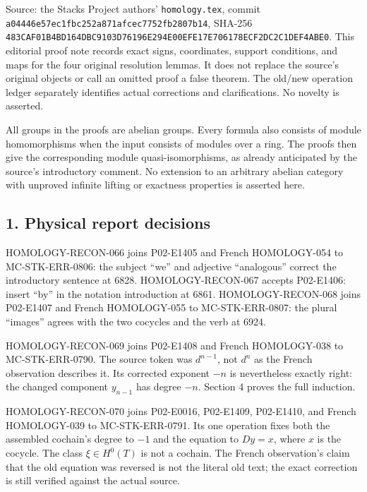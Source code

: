 \documentclass[11pt]{article}
\begin{document}
Source: the Stacks Project authors' \texttt{homology.tex}, commit \texttt{a04446e5\allowbreak{}7ec1fbc2\allowbreak{}52a871af\allowbreak{}cec7752f\allowbreak{}b2807b14}, SHA-256 \texttt{483CAF01\allowbreak{}B4BD164D\allowbreak{}BC9103D7\allowbreak{}6196E294\allowbreak{}E00EFE17\allowbreak{}E706178E\allowbreak{}CF2DC2C1\allowbreak{}DEF4ABE0}. This editorial proof note records exact signs, coordinates, support conditions, and maps for the four original resolution lemmas. It does not replace the source's original objects or call an omitted proof a false theorem. The old/new operation ledger separately identifies actual corrections and clarifications. No novelty is asserted.

All groups in the proofs are abelian groups. Every formula also consists of module homomorphisms when the input consists of modules over a ring. The proofs then give the corresponding module quasi-isomorphisms, as already anticipated by the source's introductory comment. No extension to an arbitrary abelian category with unproved infinite lifting or exactness properties is asserted here.

\subsection{1. Physical report decisions}\label{note-08-physical-report-decisions}

HOMOLOGY-RECON-066 joins P02-E1405 and French HOMOLOGY-054 to MC-STK-ERR-0806: the subject ``we'' and adjective ``analogous'' correct the introductory sentence at 6828. HOMOLOGY-RECON-067 accepts P02-E1406: insert ``by'' in the notation introduction at 6861. HOMOLOGY-RECON-068 joins P02-E1407 and French HOMOLOGY-055 to MC-STK-ERR-0807: the plural ``images'' agrees with the two cocycles and the verb at 6924.

HOMOLOGY-RECON-069 joins P02-E1408 and French HOMOLOGY-038 to MC-STK-ERR-0790. The source token was \(d^{n-1}\), not \(d^n\) as the French observation describes it. Its corrected exponent \(-n\) is nevertheless exactly right: the changed component \(y_{n-1}\) has degree \(-n\). Section 4 proves the full induction.

HOMOLOGY-RECON-070 joins P02-E0016, P02-E1409, P02-E1410, and French HOMOLOGY-039 to MC-STK-ERR-0791. Its one operation fixes both the assembled cochain's degree to \(-1\) and the equation to \(Dy=x\), where \(x\) is the cocycle. The class \(\xi\in H^0(T)\) is not a cochain. The French observation's claim that the old equation was reversed is not the literal old text; the exact correction is still verified against the actual source.
\end{document}
